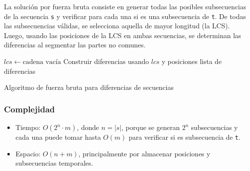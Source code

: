 La soluci\'on por fuerza bruta consiste en generar todas las posibles subsecuencias de la secuencia \texttt{s} y verificar para cada una si es una subsecuencia de \texttt{t}. De todas las subsecuencias v\'alidas, se selecciona aquella de mayor longitud (la LCS). Luego, usando las posiciones de la LCS en ambas secuencias, se determinan las diferencias al segmentar las partes no comunes.

\begin{algorithm}[H]
\SetAlgoLined
{}
$lcs \leftarrow \text{cadena vac\'ia}$\;
Construir diferencias usando $lcs$ y posiciones\;
\Return lista de diferencias
\caption{Algoritmo de fuerza bruta para diferencias de secuencias}
\end{algorithm}

\subsubsection*{Complejidad}
\begin{itemize}
  \item Tiempo: \( O(2^n \cdot m) \), donde \( n = |s| \), porque se generan \( 2^n \) subsecuencias y cada una puede tomar hasta \( O(m) \) para verificar si es subsecuencia de \texttt{t}.
  \item Espacio: \( O(n + m) \), principalmente por almacenar posiciones y subsecuencias temporales.
\end{itemize}